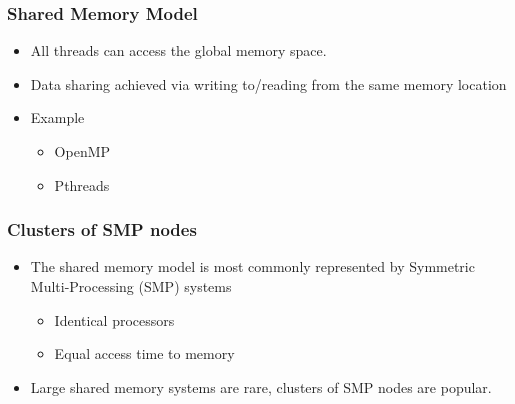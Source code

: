\documentclass[c,mathserif,compress,xcolor=svgnames]{beamer}
\begin{document}
\begin{frame}
  \frametitle{\small Shared Memory Model}
    \begin{itemize}
      \item All threads can access the global memory space.
      \item Data sharing achieved via writing to/reading from the same memory location
      \item Example
      \begin{itemize}
        \item OpenMP
        \item Pthreads
      \end{itemize}
    \end{itemize}
    
\end{frame}


\begin{frame}
  \frametitle{\small Clusters of SMP nodes}
  \begin{itemize}
    \item The shared memory model is most commonly represented by Symmetric Multi-Processing (SMP) systems
    \begin{itemize}
      \item Identical processors
      \item Equal access time to memory
    \end{itemize}
    \item Large shared memory systems are rare, clusters of SMP nodes are popular.
  \end{itemize}

  
\end{frame}
\end{document}
